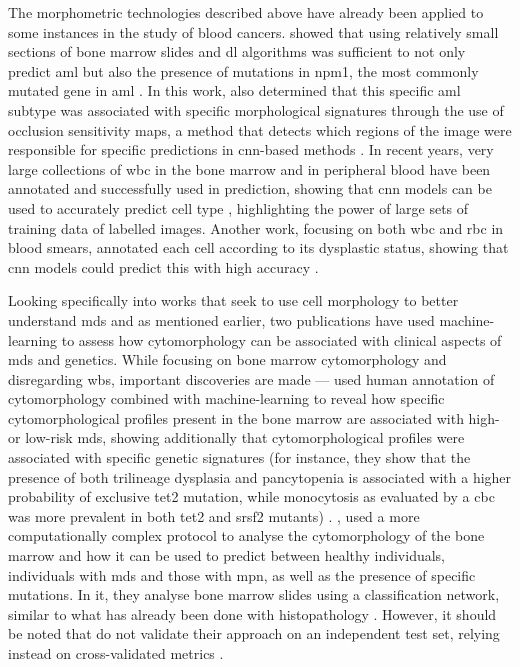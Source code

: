 The morphometric technologies described above have already been applied to some instances in the study of blood cancers.  showed that using relatively small sections of bone marrow slides and \ac{dl} algorithms was sufficient to not only predict \ac{aml} but also the presence of mutations in \ac{npm1}, the most commonly mutated gene in \ac{aml} \cite{Eckardt2021-fb}. In this work,  also determined that this specific \ac{aml} subtype was associated with specific morphological signatures through the use of occlusion sensitivity maps, a method that detects which regions of the image were responsible for specific predictions in \ac{cnn}-based methods \cite{Zeiler2013-jk}. In recent years, very large collections of \ac{wbc} in the bone marrow and in peripheral blood have been annotated and successfully used in prediction, showing that \ac{cnn} models can be used to accurately predict cell type \cite{Matek2019-ld,Matek2021-mp,Kouzehkanan2021-mz}, highlighting the power of large sets of training data of labelled images. Another work, focusing on both \ac{wbc} and \ac{rbc} in blood smears, annotated each cell according to its dysplastic status, showing that \ac{cnn} models could predict this with high accuracy \cite{Mori2020-dn}.

Looking specifically into works that seek to use cell morphology to better understand \ac{mds} and as mentioned earlier, two publications have used machine-learning to assess how cytomorphology can be associated with clinical aspects of \ac{mds} and genetics. While focusing on bone marrow cytomorphology and disregarding \ac{wbs}, important discoveries are made ---  used human annotation of cytomorphology combined with machine-learning to reveal how specific cytomorphological profiles present in the bone marrow are associated with high- or low-risk \ac{mds}, showing additionally that cytomorphological profiles were associated with specific genetic signatures (for instance, they show that the presence of both trilineage dysplasia and pancytopenia is associated with a higher probability of exclusive \ac{tet2} mutation, while monocytosis as evaluated by a \ac{cbc} was more prevalent in both \ac{tet2} and \ac{srsf2} mutants) \cite{Nagata2020-lh}. , used a more computationally complex protocol to analyse the cytomorphology of the bone marrow and how it can be used to predict between healthy individuals, individuals with \ac{mds} and those with \ac{mpn}, as well as the presence of specific mutations. In it, they analyse bone marrow slides using a classification network, similar to what has already been done with histopathology \cite{Fu2020-mx}. However, it should be noted that  do not validate their approach on an independent test set, relying instead on cross-validated metrics \cite{Bruck2021-fx}. 

